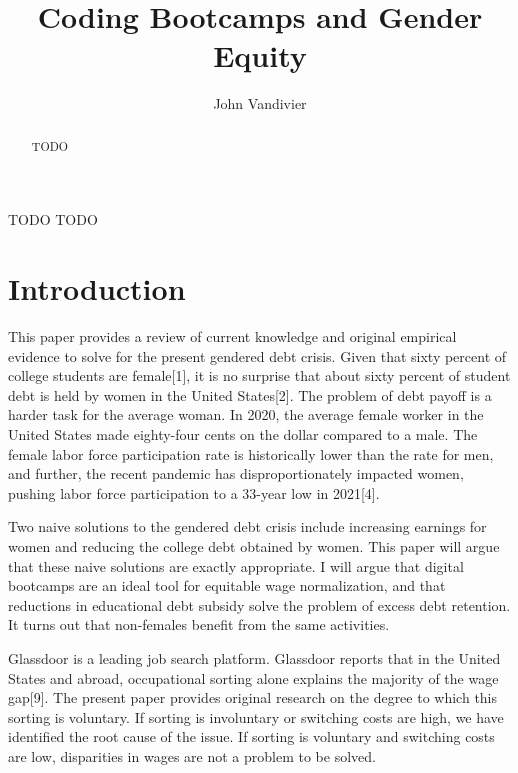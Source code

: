 \documentclass[review]{elsarticle}
\begin{document}
\begin{frontmatter}

    \title{
        Coding Bootcamps and Gender Equity
    }

    \author[mymainaddress]{John Vandivier}

    \begin{abstract}
        TODO
    \end{abstract}

    \begin{keyword}
        TODO %
        \MSC[2010] TODO %
    \end{keyword}

\end{frontmatter}

\pagebreak
\linenumbers

\section{Introduction}

This paper provides a review of current knowledge and original empirical evidence to solve for the present gendered debt crisis.
Given that sixty percent of college students are female[1],
it is no surprise that about sixty percent of student debt is held by women in the United States[2].
The problem of debt payoff is a harder task for the average woman.
In 2020, the average female worker in the United States made eighty-four cents on the dollar compared to a male.
The female labor force participation rate is historically lower than the rate for men,
and further,
the recent pandemic has disproportionately impacted women, pushing labor force participation to a 33-year low in 2021[4].

Two naive solutions to the gendered debt crisis include
increasing earnings for women
and reducing the college debt obtained by women.
This paper will argue that these naive solutions are exactly appropriate.
I will argue that digital bootcamps are an ideal tool for equitable wage normalization,
and that reductions in educational debt subsidy solve the problem of excess debt retention.
It turns out that non-females benefit from the same activities.


Glassdoor is a leading job search platform.
Glassdoor reports that in the United States and abroad, occupational sorting alone explains the majority of the wage gap[9].
The present paper provides original research on the degree to which this sorting is voluntary.
If sorting is involuntary or switching costs are high, we have identified the root cause of the issue.
If sorting is voluntary and switching costs are low, disparities in wages are not a problem to be solved.
\end{document}
